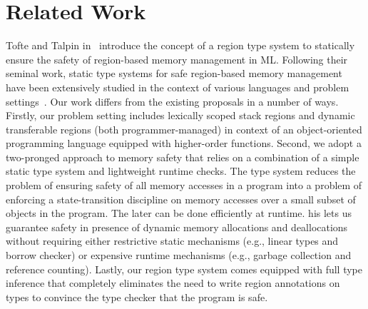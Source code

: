 \section{Related Work}
\label{sec:related-work}


Tofte and Talpin in~\cite{tofte93,tofte94,tofte97} introduce the
concept of a region type system to statically ensure the safety of
region-based memory management in ML. Following their seminal work,
static type systems for safe region-based memory management have been
extensively studied in the context of various languages and problem
settings~\cite{cyclone02, cyclone04, yates99, MIT03, DPJ09, HMN01,
WW01, rust}. Our work differs from the existing proposals in a number
of ways. Firstly, our problem setting includes lexically scoped stack
regions and dynamic transferable regions (both programmer-managed) in
context of an object-oriented programming language equipped with
higher-order functions. Second, we adopt a two-pronged approach to
memory safety that relies on a combination of a simple static type
system and lightweight runtime checks. The type system reduces the
problem of ensuring safety of all memory accesses in a program into a
problem of enforcing a state-transition discipline on memory accesses
over a small subset of objects in the program. The later can be done
efficiently at runtime. his lets us guarantee safety in presence of
dynamic memory allocations and deallocations without requiring either
restrictive static mechanisms (e.g., linear types and borrow checker)
or expensive runtime mechanisms (e.g., garbage collection and
reference counting). Lastly, our region type system comes equipped
with full type inference that completely eliminates the need to write
region annotations on types to convince the type checker that the
program is safe. 


